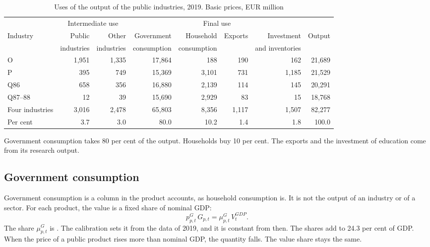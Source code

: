 \documentclass[11pt,a4paper]{article}
\newcommand{\code}[1]{\texttt{\detokenize{#1}}}
\newcommand{\GDP}{\mathit{GDP}}
\begin{document}
\begin{table}[!htbp]
\centering
\small
\caption{Uses of the output of the public industries, 2019. Basic prices, EUR million}
\label{tab:uses}
\setlength{\tabcolsep}{4pt}
\begin{tabular}{@{}lrrrrrrr@{}}
\toprule
 & \multicolumn{2}{c}{Intermediate use} & \multicolumn{4}{c}{Final use} & \\
\cmidrule(lr){2-3}\cmidrule(lr){4-7}
Industry & Public & Other & Government & Household & Exports & Investment & Output \\
 & industries & industries & consumption & consumption & & and inventories & \\
\midrule
O & 1,951 & 1,335 & 17,864 & 188 & 190 & 162 & 21,689 \\
P & 395 & 749 & 15,369 & 3,101 & 731 & 1,185 & 21,529 \\
Q86 & 658 & 356 & 16,880 & 2,139 & 114 & 145 & 20,291 \\
Q87--88 & 12 & 39 & 15,690 & 2,929 & 83 & 15 & 18,768 \\
\midrule
Four industries & 3,016 & 2,478 & 65,803 & 8,356 & 1,117 & 1,507 & 82,277 \\
Per cent & 3.7 & 3.0 & 80.0 & 10.2 & 1.4 & 1.8 & 100.0 \\
\bottomrule
\end{tabular}
\end{table}

Government consumption takes 80 per cent of the output. Households buy 10 per cent.
The exports and the investment of education come from its research output.

\subsection{Government consumption}

Government consumption is a column in the product accounts, as household consumption is. It is not the output of an industry or of a sector.
For each product, the value is a fixed share of nominal GDP:
\begin{equation}
p^G_{p,t}\, G_{p,t} = \mu^G_{p,t}\, V^{\GDP}_t .
\label{eq:g}
\end{equation}
The share $\mu^G_{p,t}$ is \code{rG2GDP_p}. The calibration sets it from the data of 2019, and it is constant from then.
The shares add to 24.3 per cent of GDP.
When the price of a public product rises more than nominal GDP, the quantity falls. The value share stays the same.
\end{document}
